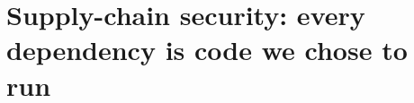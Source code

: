 \chapter{Supply-chain security: every dependency is code we chose to run}
\label{ch:supply-chain-security-every-dependency}

